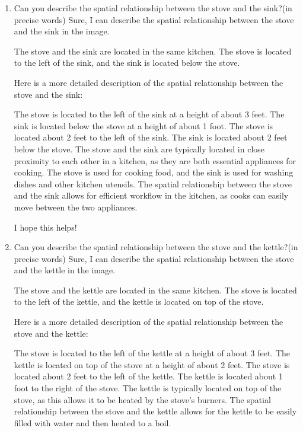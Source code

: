 \begin{enumerate}
    \item Can you describe the spatial relationship between the stove and the sink?(in precise words)
    \subitem 
    Sure, I can describe the spatial relationship between the stove and the sink in the image.
    
    The stove and the sink are located in the same kitchen. The stove is located to the left of the sink, and the sink is located below the stove.
    
    Here is a more detailed description of the spatial relationship between the stove and the sink:
    
    The stove is located to the left of the sink at a height of about 3 feet.
    The sink is located below the stove at a height of about 1 foot.
    The stove is located about 2 feet to the left of the sink.
    The sink is located about 2 feet below the stove.
    The stove and the sink are typically located in close proximity to each other in a kitchen, as they are both essential appliances for cooking. The stove is used for cooking food, and the sink is used for washing dishes and other kitchen utensils. The spatial relationship between the stove and the sink allows for efficient workflow in the kitchen, as cooks can easily move between the two appliances.
    
    I hope this helps!
    \item Can you describe the spatial relationship between the stove and the kettle?(in precise words)
    \subitem 
    Sure, I can describe the spatial relationship between the stove and the kettle in the image.
    
    The stove and the kettle are located in the same kitchen. The stove is located to the left of the kettle, and the kettle is located on top of the stove.
    
    Here is a more detailed description of the spatial relationship between the stove and the kettle:
    
    The stove is located to the left of the kettle at a height of about 3 feet.
    The kettle is located on top of the stove at a height of about 2 feet.
    The stove is located about 2 feet to the left of the kettle.
    The kettle is located about 1 foot to the right of the stove.
    The kettle is typically located on top of the stove, as this allows it to be heated by the stove's burners. The spatial relationship between the stove and the kettle allows for the kettle to be easily filled with water and then heated to a boil.
    

\end{enumerate}
